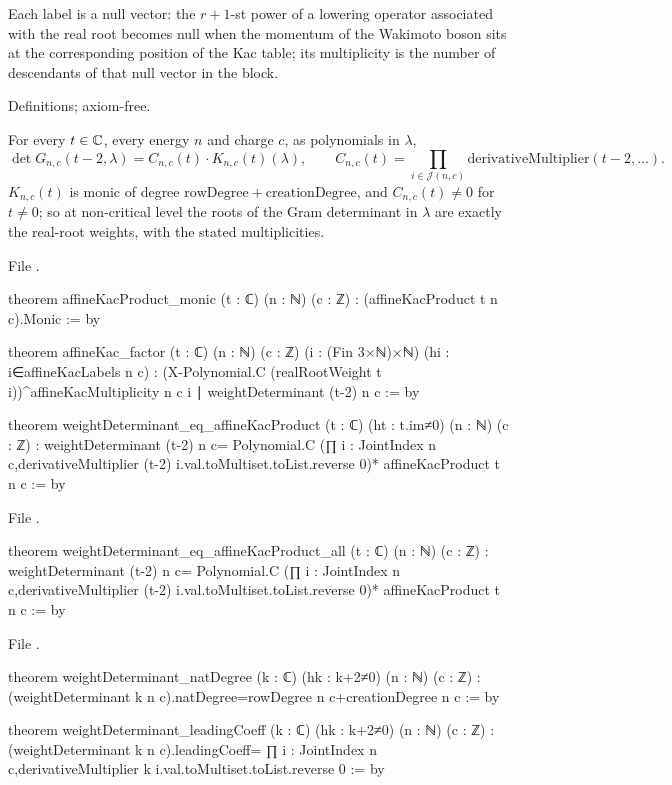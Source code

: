 \begin{physics}
Each label is a null vector: the $r+1$-st power of a lowering operator associated with the real root
becomes null when the momentum of the Wakimoto boson sits at the corresponding position of the Kac
table; its multiplicity is the number of descendants of that null vector in the block.
\end{physics}

\begin{status}
Definitions; axiom-free.
\end{status}

\begin{theorem}\label{l08:thm:kac}
For every $t\in{\mathbb{C}}$, every energy $n$ and charge $c$, as polynomials in $\lambda$,
\begin{equation*}
  \det G_{n,c}(t-2,\lambda) = C_{n,c}(t)\cdot K_{n,c}(t)(\lambda),\qquad
  C_{n,c}(t) = \prod_{i\in\mathcal J(n,c)}\mathrm{derivativeMultiplier}(t-2,\ldots).
\end{equation*}
$K_{n,c}(t)$ is monic of degree $\mathrm{rowDegree}+\mathrm{creationDegree}$, and $C_{n,c}(t)\ne0$ for $t\ne0$; so at
non-critical level the roots of the Gram determinant in $\lambda$ are exactly the real-root weights, with the
stated multiplicities.
\end{theorem}

\noindent File .
\begin{leancode}
theorem affineKacProduct_monic (t : ℂ) (n : ℕ) (c : ℤ) : (affineKacProduct t n c).Monic := by

theorem affineKac_factor (t : ℂ) (n : ℕ) (c : ℤ) (i : (Fin 3×ℕ)×ℕ)
    (hi : i∈affineKacLabels n c) :
    (X-Polynomial.C (realRootWeight t i))^affineKacMultiplicity n c i ∣ weightDeterminant (t-2) n c := by

theorem weightDeterminant_eq_affineKacProduct (t : ℂ) (ht : t.im≠0) (n : ℕ) (c : ℤ) :
    weightDeterminant (t-2) n c=
      Polynomial.C (∏ i : JointIndex n c,derivativeMultiplier (t-2) i.val.toMultiset.toList.reverse 0)*
        affineKacProduct t n c := by
\end{leancode}
\noindent File .
\begin{leancode}
theorem weightDeterminant_eq_affineKacProduct_all (t : ℂ) (n : ℕ) (c : ℤ) :
    weightDeterminant (t-2) n c=
      Polynomial.C (∏ i : JointIndex n c,derivativeMultiplier (t-2) i.val.toMultiset.toList.reverse 0)*
        affineKacProduct t n c := by
\end{leancode}
\noindent File .
\begin{leancode}
theorem weightDeterminant_natDegree (k : ℂ) (hk : k+2≠0) (n : ℕ) (c : ℤ) :
    (weightDeterminant k n c).natDegree=rowDegree n c+creationDegree n c := by

theorem weightDeterminant_leadingCoeff (k : ℂ) (hk : k+2≠0) (n : ℕ) (c : ℤ) :
    (weightDeterminant k n c).leadingCoeff=
      ∏ i : JointIndex n c,derivativeMultiplier k i.val.toMultiset.toList.reverse 0 := by
\end{leancode}

